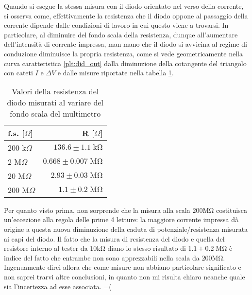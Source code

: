 \documentclass{article}[a4paper, oneside ,11pt]
\begin{document}
Quando si esegue la stessa misura con il diodo orientato nel verso della corrente, si osserva come, effettivamente la resistenza che il diodo oppone al passaggio della corrente dipende dalle condizioni di lavoro in cui questo viene a trovarsi. In particolare, al diminuire del fondo scala della resistenza, dunque all'aumentare dell'intensità di corrente impressa, man mano che il diodo si avvicina al regime di conduzione diminuisce la propria resistenza, come si vede geometricamente nella curva caratteristica \ref{plt:did_out} dalla diminuzione della cotangente del triangolo con cateti $I$ e $\Delta V$ e dalle misure riportate nella tabella \ref{tab: did}.\\
\begin{table}[!htbp]
	\begin{center}
		\begin{tabular}{lr}
		\toprule	
		f.s. [$\Omega$]  & R [$\Omega$]						\\
		\midrule
		\midrule
		200 k$\Omega$ & $136.6 \pm 1.1 \; \si{\kilo\ohm}$	\\
		2 M$\Omega$   & $0.668 \pm 0.007 \;  \si{\mega\ohm}$\\
		20 M$\Omega$  & $2.93 \pm 0.03 \; \si{\mega\ohm}$   \\
		200 M$\Omega$ & $1.1 \pm 0.2 \;  \si{\mega\ohm}$	\\
		\bottomrule        
		\end{tabular}
		\caption{Valori della resistenza del diodo misurati al variare del fondo scala del multimetro \label{tab: did}}
	\end{center}
\end{table}
Per quanto visto prima, non sorprende che la misura alla scala $200 \si{\mega\ohm}$ costituisca un'eccezione alla regola delle prime 4 letture: la maggiore corrente impressa dà origine a questa nuova diminuzione della caduta di potenziale/resistenza misurata ai capi del diodo. Il fatto che la misura di resistenza del diodo e quella del resistore interno al tester da $10 \si{\kilo\ohm}$ diano lo stesso risultato di $1.1 \pm 0.2 \;  \si{\mega\ohm}$ è indice del fatto che entrambe non sono apprezzabili nella scala da $200 \si{\mega\ohm}$. Ingenuamente direi allora che come misure non abbiano particolare significato e non saprei trarvi altre conclusioni, in quanto non mi risulta chiaro neanche quale sia l'incertezza ad esse associata. =(
\end{document}
